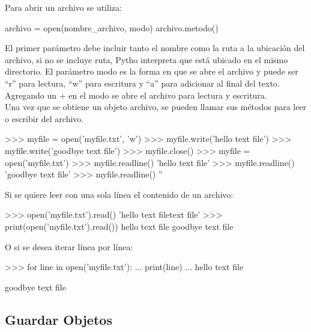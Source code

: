 Para abrir un archivo se utiliza:\\

\begin{pyglist} [language=python]
archivo = open(nombre\_archivo, modo)
archivo.metodo()
\end{pyglist}

El primer parámetro debe incluir tanto el nombre como la ruta a la ubicación del archivo, si no se incluye ruta, Pytho interpreta que está ubicado en el mismo directorio. El parámetro modo es la forma en que se abre el archivo y puede ser ``r'' para lectura, ``w'' para escritura y ``a'' para adicionar al final del texto. Agregando un + en el modo se abre el archivo para lectura y escritura.\\

Una vez que se obtiene un objeto archivo, se pueden llamar sus métodos para leer o escribir del archivo.\\

\begin{pyglist} [language=python]
>>> myfile = open('myfile.txt', 'w')
>>> myfile.write('hello text file\n')
>>> myfile.write('goodbye text file\n')
>>> myfile.close()
>>> myfile = open('myfile.txt')
>>> myfile.readline()
'hello text file\n'
>>> myfile.readline()
'goodbye text file\n'
>>> myfile.readline()
''
\end{pyglist}

Si se quiere leer con una sola línea el contenido de un archivo:\\

\begin{pyglist} [language=python]
>>> open('myfile.txt').read() 
'hello text file\ngoodbye text file\n'
>>> print(open('myfile.txt').read()) 
hello text file
goodbye text file
\end{pyglist}

O si se desea iterar línea por línea:\\

\begin{pyglist} [language=python]
>>> for line in open('myfile.txt'):
...     print(line)
... 
hello text file

goodbye text file

\end{pyglist}

\subsection{Guardar Objetos}

